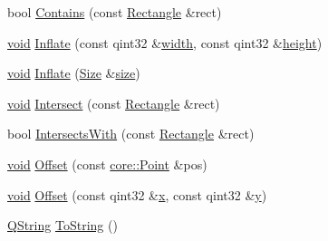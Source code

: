 \begin{DoxyCompactItemize}
\item 
bool \hyperlink{group___o_p_map_widget_gaaaaf9a5129b7af2409ad9a9e54698206}{Contains} (const \hyperlink{structinternals_1_1_rectangle}{Rectangle} \&rect)
\item 
\hyperlink{group___u_a_v_objects_plugin_ga444cf2ff3f0ecbe028adce838d373f5c}{void} \hyperlink{group___o_p_map_widget_ga75ec4589acf2aef1446a948b34b40cb9}{Inflate} (const qint32 \&\hyperlink{glext_8h_a76aaa5c50746272e7d2de9aece921757}{width}, const qint32 \&\hyperlink{glext_8h_ae23e72c69f79d0aa647aa7929ef3f232}{height})
\item 
\hyperlink{group___u_a_v_objects_plugin_ga444cf2ff3f0ecbe028adce838d373f5c}{void} \hyperlink{group___o_p_map_widget_ga60b97161857418ee4ec8a2def48176e8}{Inflate} (\hyperlink{structcore_1_1_size}{Size} \&\hyperlink{glext_8h_a014d89bd76f74ef3a29c8f04b473eb76}{size})
\item 
\hyperlink{group___u_a_v_objects_plugin_ga444cf2ff3f0ecbe028adce838d373f5c}{void} \hyperlink{group___o_p_map_widget_ga1eacc8faeb8cf4c202dc6eb3a2cd7482}{Intersect} (const \hyperlink{structinternals_1_1_rectangle}{Rectangle} \&rect)
\item 
bool \hyperlink{group___o_p_map_widget_gae5e839ee40fb95a93687ee17445de718}{Intersects\-With} (const \hyperlink{structinternals_1_1_rectangle}{Rectangle} \&rect)
\item 
\hyperlink{group___u_a_v_objects_plugin_ga444cf2ff3f0ecbe028adce838d373f5c}{void} \hyperlink{group___o_p_map_widget_ga66c531d30a3208df417c71ee0cb3ce72}{Offset} (const \hyperlink{structcore_1_1_point}{core\-::\-Point} \&pos)
\item 
\hyperlink{group___u_a_v_objects_plugin_ga444cf2ff3f0ecbe028adce838d373f5c}{void} \hyperlink{group___o_p_map_widget_gaa8fc3eba71f76d8e6264cd610bb11952}{Offset} (const qint32 \&\hyperlink{glext_8h_a1db9d104e3c2128177f26aff7b46982f}{x}, const qint32 \&\hyperlink{glext_8h_a42315f3ed8fff752bb47fd782309fcfc}{y})
\item 
\hyperlink{group___u_a_v_objects_plugin_gab9d252f49c333c94a72f97ce3105a32d}{Q\-String} \hyperlink{group___o_p_map_widget_gacc8a6c81527141fc59b3ba245b35c297}{To\-String} ()
\end{DoxyCompactItemize}
